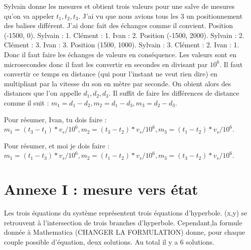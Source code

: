 \documentclass[a4paper, 8pt]{article}
\begin{document}
Sylvain donne les mesures et obtient trois valeurs pour une salve de mesures qu'on va appeler $t_1, t_2, t_3$. J'ai vu que nous avions tous les 3 un positionnement des balises différent. J'ai donc fait des échanges comme il convient.
Position (-1500, 0). Sylvain : 1. Clément : 1. Ivan : 2.
Position (-1500, 2000). Sylvain : 2. Clément : 3. Ivan : 3.
Position (1500, 1000). Sylvain : 3. Clément : 2. Ivan : 1.
Donc il faut faire les échanges de valeurs en conséquence. Les valeurs sont en microsecondes donc il faut les convertir en secondes en divisant par $10^6$. Il faut convertir ce temps en distance (qui pour l'instant ne veut rien dire) en multipliant par la vitesse du son en mètre par seconde. On obient alors des distances que l'on appelle $d_1, d_2, d_3$. Il suffit de faire les différences de distance comme il suit : $m_1 = d_1 - d_2, m_2 = d_1 - d_3, m_3 = d_2 - d_3$.

Pour résumer, Ivan, tu dois faire : $m_1 = (t_3 - t_1)*v_s/10^6, m_2 = (t_3 - t_2)*v_s/10^6, m_3 = (t_1 - t_2)*v_s/10^6$.

Pour résumer, et moi je dois faire : $m_1 = (t_1 - t_3)*v_s/10^6, m_2 = (t_1 - t_2)*v_s/10^6, m_3 = (t_3 - t_2)*v_s/10^6$.

\section{Annexe I : mesure vers état}

Les trois équations du système représentent trois équations d'hyperbole. (x,y) se retrouvent à l'intersection de trois branches d'hyperbole. Cependant,la formule donnée à Mathematica (CHANGER LA FORMULATION) donne, pour chaque couple possible d'équation, deux solutions. Au total il y a 6 solutions.
\end{document}
